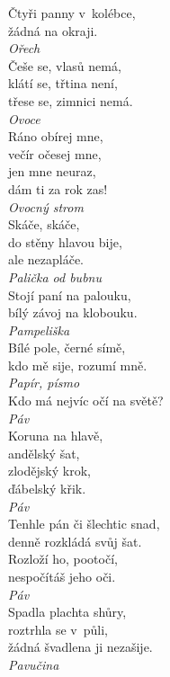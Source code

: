 \begin{multicols}{3}
\noindent
Čtyři panny v~kolébce,\\
žádná na okraji.\\[1 mm]
{\sl Ořech}\\

\noindent
Češe se, vlasů nemá,\\
klátí se, třtina není,\\
třese se, zimnici nemá.\\[1 mm]
{\sl Ovoce}\\

\noindent
Ráno obírej mne,\\
večír očesej mne,\\
jen mne neuraz,\\
dám ti za rok zas!\\[1 mm]
{\sl Ovocný strom}\\

\noindent
Skáče, skáče,\\
do stěny hlavou bije,\\
ale nezapláče.\\[1 mm]
{\sl Palička od bubnu}\\

\noindent
Stojí paní na palouku,\\
bílý závoj na klobouku.\\[1 mm]
{\sl Pampeliška}\\

\noindent
Bílé pole, černé símě,\\
kdo mě sije, rozumí mně.\\[1 mm]
{\sl Papír, písmo}\\

\noindent
Kdo má nejvíc očí na světě?\\[1 mm]
{\sl Páv}\\

\noindent
Koruna na hlavě,\\
andělský šat,\\
zlodějský krok,\\
ďábelský křik.\\[1 mm]
{\sl Páv}\\

\noindent
Tenhle pán či šlechtic snad,\\
denně rozkládá svůj šat.\\
Rozloží ho, pootočí,\\
nespočítáš jeho oči.\\[1 mm]
{\sl Páv}\\

\noindent
Spadla plachta shůry,\\
roztrhla se v~půli,\\
žádná švadlena ji nezašije.\\[1 mm]
{\sl Pavučina}\\


\end{multicols}
